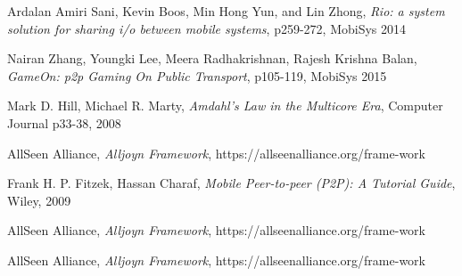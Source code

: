 \documentclass[conference]{IEEEtran}
\begin{document}
\begin{thebibliography}{100}
Ardalan Amiri Sani, Kevin Boos, Min Hong Yun, and Lin Zhong, \emph{Rio: a system solution for sharing i/o between mobile systems}, p259-272, MobiSys 2014

Nairan Zhang, Youngki Lee, Meera Radhakrishnan, Rajesh Krishna Balan, \emph{GameOn: p2p Gaming On Public Transport}, p105-119, MobiSys 2015

Mark D. Hill, Michael R. Marty, \emph{Amdahl's Law in the Multicore Era}, Computer Journal p33-38, 2008

AllSeen Alliance, \emph{Alljoyn Framework}, https://allseenalliance.org/frame-work

Frank H. P. Fitzek, Hassan Charaf, \emph{Mobile Peer-to-peer (P2P): A Tutorial Guide}, Wiley, 2009

AllSeen Alliance, \emph{Alljoyn Framework}, https://allseenalliance.org/frame-work

AllSeen Alliance, \emph{Alljoyn Framework}, https://allseenalliance.org/frame-work


\end{thebibliography}
\end{document}
